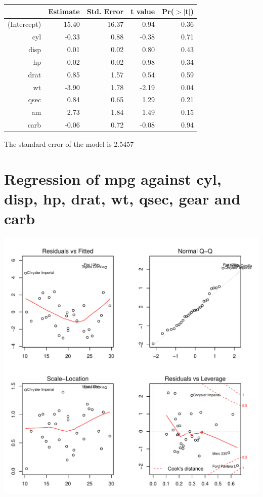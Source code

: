 \documentclass{article}\usepackage[]{graphicx}\usepackage[]{color}
\makeatletter
\def\maxwidth{ %
  \ifdim\Gin@nat@width>\linewidth
    \linewidth
  \else
    \Gin@nat@width
  \fi
}
\newenvironment{knitrout}{}{} %
\makeatother
\begin{document}
\begin{table}[ht]
\centering
\begin{tabular}{rrrrr}
  \hline
 & Estimate & Std. Error & t value & Pr($>$$|$t$|$) \\ 
  \hline
(Intercept) & 15.40 & 16.37 & 0.94 & 0.36 \\ 
  cyl & -0.33 & 0.88 & -0.38 & 0.71 \\ 
  disp & 0.01 & 0.02 & 0.80 & 0.43 \\ 
  hp & -0.02 & 0.02 & -0.98 & 0.34 \\ 
  drat & 0.85 & 1.57 & 0.54 & 0.59 \\ 
  wt & -3.90 & 1.78 & -2.19 & 0.04 \\ 
  qsec & 0.84 & 0.65 & 1.29 & 0.21 \\ 
  am & 2.73 & 1.84 & 1.49 & 0.15 \\ 
  carb & -0.06 & 0.72 & -0.08 & 0.94 \\ 
   \hline
\end{tabular}
\end{table}




The standard error of the model is 2.5457

\newpage

\section{Regression of mpg against cyl, disp, hp, drat, wt, qsec, gear and carb }
\begin{knitrout}
\color{fgcolor}

{\centering \includegraphics[width=\maxwidth]{figure/lm-cyl-disp-hp-drat-wt-qsec-gear-carb} 

}



\end{knitrout}
\end{document}
